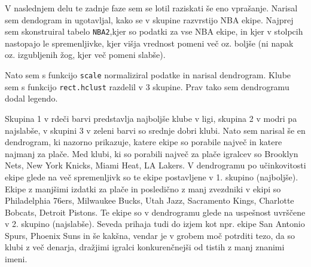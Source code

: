 \documentclass[11pt,a4paper]{article}
\begin{document}

\newpage
V naslednjem delu te zadnje faze sem se lotil raziskati še eno vprašanje. Narisal sem dendogram in ugotavljal, kako se v skupine razvrstijo NBA ekipe. Najprej sem skonstruiral tabelo \verb|NBA2|,kjer so podatki za vse NBA ekipe,
in kjer v stolpcih nastopajo le spremenljivke, kjer višja vrednost pomeni več oz. boljše (ni napak oz. izgubljenih žog, kjer več pomeni slabše).
\medskip

Nato sem s funkcijo \verb|scale| normaliziral podatke in narisal dendrogram.
Klube sem s funkcijo \verb|rect.hclust| razdelil v 3 skupine. Prav tako sem dendrogramu dodal legendo.
\smallskip


\newpage
Skupina 1 v rdeči barvi predstavlja najboljše klube v ligi, skupina 2 v modri pa najslabše, v skupini 3 v zeleni barvi so srednje dobri klubi.
Nato sem narisal še en dendrogram, ki nazorno prikazuje, katere ekipe so porabile največ in katere najmanj za plače. Med klubi, ki so porabili največ za plače igralcev so Brooklyn Nets, New York Knicks, Miami Heat, LA Lakers. V dendrogramu po učinkovitosti ekipe glede na več spremenljivk so te ekipe postavljene v 1. skupino (najboljše). Ekipe z manjšimi izdatki za plače in posledično z manj zvezdniki v ekipi so Philadelphia 76ers, Milwaukee Bucks, Utah Jazz, Sacramento Kings, Charlotte Bobcats, Detroit Pistons. Te ekipe so v dendrogramu glede na uspešnost uvrščene v 2. skupino (najslabše). Seveda prihaja tudi do izjem kot npr. ekipe San Antonio Spurs, Phoenix Suns in še kakšna, vendar je v grobem moč potrditi tezo, da so klubi z več denarja, dražjimi igralci konkurenčnejši od tistih z manj znanimi imeni.

\medskip
\end{document}
